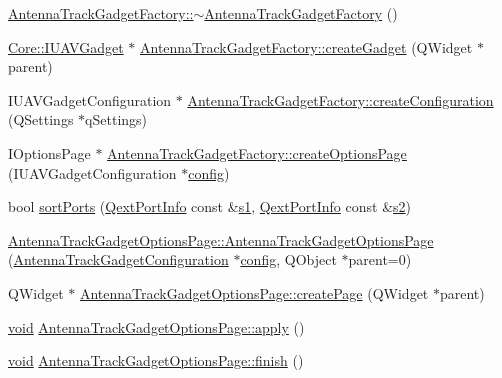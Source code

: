 \begin{DoxyCompactItemize}
\hyperlink{group___antenna_track_gadget_plugin_ga6d885117d7af90d116622d81273651cd}{Antenna\-Track\-Gadget\-Factory\-::$\sim$\-Antenna\-Track\-Gadget\-Factory} ()
\item 
\hyperlink{class_core_1_1_i_u_a_v_gadget}{Core\-::\-I\-U\-A\-V\-Gadget} $\ast$ \hyperlink{group___antenna_track_gadget_plugin_ga50d1ad5798eee9e1ca60c3e1bf0559fc}{Antenna\-Track\-Gadget\-Factory\-::create\-Gadget} (Q\-Widget $\ast$parent)
\item 
I\-U\-A\-V\-Gadget\-Configuration $\ast$ \hyperlink{group___antenna_track_gadget_plugin_gaa4cb4bdba7574a5ba89c52f6791bc6d4}{Antenna\-Track\-Gadget\-Factory\-::create\-Configuration} (Q\-Settings $\ast$q\-Settings)
\item 
I\-Options\-Page $\ast$ \hyperlink{group___antenna_track_gadget_plugin_ga7645577ffc0de3e891b3ea2388c73e48}{Antenna\-Track\-Gadget\-Factory\-::create\-Options\-Page} (I\-U\-A\-V\-Gadget\-Configuration $\ast$\hyperlink{deflate_8c_a4473b5227787415097004fd39f55185e}{config})
\item 
bool \hyperlink{group___antenna_track_gadget_plugin_ga6244f67dce3641a662a3c15f4eba081b}{sort\-Ports} (\hyperlink{struct_qext_port_info}{Qext\-Port\-Info} const \&\hyperlink{_o_p_plots_8m_a2f07e0f444810cc4e54ee2be2ce0ac65}{s1}, \hyperlink{struct_qext_port_info}{Qext\-Port\-Info} const \&\hyperlink{_o_p_plots_8m_a2e63e71737e8b6802b81f6a7c5ca6a0a}{s2})
\item 
\hyperlink{group___antenna_track_gadget_plugin_gaf422edb8885c7e52f91e53e8671ca7e7}{Antenna\-Track\-Gadget\-Options\-Page\-::\-Antenna\-Track\-Gadget\-Options\-Page} (\hyperlink{class_antenna_track_gadget_configuration}{Antenna\-Track\-Gadget\-Configuration} $\ast$\hyperlink{deflate_8c_a4473b5227787415097004fd39f55185e}{config}, Q\-Object $\ast$parent=0)
\item 
Q\-Widget $\ast$ \hyperlink{group___antenna_track_gadget_plugin_gab61c88a985c6dddb814fbd1dbb7a6455}{Antenna\-Track\-Gadget\-Options\-Page\-::create\-Page} (Q\-Widget $\ast$parent)
\item 
\hyperlink{group___u_a_v_objects_plugin_ga444cf2ff3f0ecbe028adce838d373f5c}{void} \hyperlink{group___antenna_track_gadget_plugin_gae05ea679125a443f47b6835fb243c3fb}{Antenna\-Track\-Gadget\-Options\-Page\-::apply} ()
\item 
\hyperlink{group___u_a_v_objects_plugin_ga444cf2ff3f0ecbe028adce838d373f5c}{void} \hyperlink{group___antenna_track_gadget_plugin_ga21f19cc8645a21200da9d3489a2a4bdf}{Antenna\-Track\-Gadget\-Options\-Page\-::finish} ()
\item 

\end{DoxyCompactItemize}
